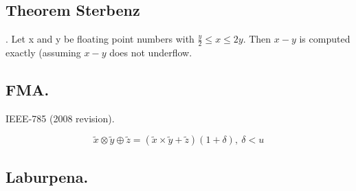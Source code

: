 \subsection*{Theorem Sterbenz}.
Let x and y be floating point numbers with $\frac{y}{2}\leq x \leq 2y$. Then $x-y$ is computed exactly (assuming $x-y$ does not underflow.

\subsection*{FMA.}
IEEE-785 (2008 revision).

\begin{equation*}
\tilde x \otimes \tilde y \oplus \tilde z= (\tilde x \times \tilde y+ \tilde z) (1+\delta), \ \delta<u 
\end{equation*}

\subsection{Laburpena.}



